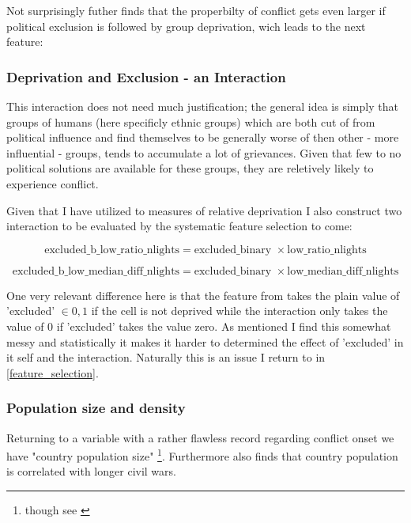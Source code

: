 \documentclass[a4paper]{article}
\begin{document}

Not surprisingly \cite{Cederman_Gleditsch_Buhaug_2013} futher finds that the properbilty of conflict gets even larger if political exclusion is followed by group deprivation, wich leads to the next feature:

\subsubsection{Deprivation and Exclusion - an Interaction}

This interaction does not need much justification; the general idea is simply that groups of humans (here specificly ethnic groups) which are both cut of from political influence and find themselves to be generally worse of then other - more influential - groups, tends to accumulate a lot of grievances. Given that few to no political solutions are available for these groups, they are reletively likely to experience conflict\cite[103-111]{Cederman_Gleditsch_Buhaug_2013}.\par

Given that I have utilized to measures of relative deprivation I also construct two interaction to be evaluated by the systematic feature selection to come:

$$ \textrm{excluded\_b\_low\_ratio\_nlights} = \textrm{excluded\_binary }\times \textrm{low\_ratio\_nlights} $$

$$ \textrm{excluded\_b\_low\_median\_diff\_nlights} = \textrm{excluded\_binary }\times \textrm{low\_median\_diff\_nlights} $$

One very relevant difference here is that the feature from \cite{Cederman_Gleditsch_Buhaug_2013} takes the plain value of 'excluded' $\in {0,1}$ if the cell is not deprived while the interaction only takes the value of 0 if 'excluded' takes the value zero. As mentioned I find this somewhat messy and statistically it makes it harder to determined the effect of 'excluded' in it self and the interaction. Naturally this is an issue I return to in \autoref{feature_selection}.\par

\subsubsection{Population size and density} 

Returning to a variable with a rather flawless record regarding conflict onset we have "country population size" \citep{Collier_Hoeffler_1998, Fearon_Laitin_2003, Collier_Hoeffler_2004, Hegre_Sambanis_2006}\footnote{though see \cite{Goldstone_2010}}. Furthermore \cite[287]{Fearon_2004} also finds that country population is correlated with longer civil wars.\par
\end{document}

